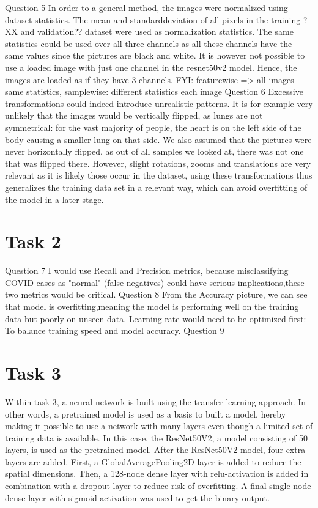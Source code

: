 \documentclass[conference]{IEEEtran}
\begin{document}
Question 5
In order to a general method, the images were normalized using dataset statistics. The mean and standarddeviation of all pixels in the training ?XX and validation?? dataset were used as normalization statistics. 
The same statistics could be used over all three channels as all these channels have the same values since the pictures are black and white. It is however not possible to use a loaded image with just one channel in the resnet50v2 model. Hence, the images are loaded as if they have 3 channels.
FYI: featurewise => all images same statistics, samplewise: different statistics each image
Question 6
Excessive transformations could indeed introduce unrealistic patterns. It is for example very unlikely that the images would be vertically flipped, as lungs are not symmetrical: for the vast majority of people, the heart is on the left side of the body causing a smaller lung on that side. 
We also assumed that the pictures were never horizontally flipped, as out of all samples we looked at, there was not one that was flipped there. However, slight rotations, zooms and translations are very relevant as it is likely those occur in the dataset, using these transformations thus generalizes the training data set in a relevant way, which can avoid overfitting of the model in a later stage.

\section{Task 2}
Question 7
I would use Recall and Precision metrics, because misclassifying COVID cases as "normal" (false negatives) could have serious implications,these two metrics would be critical.
Question 8
From the Accuracy picture, we can see that model is overfitting,meaning the model is performing well on the training data but poorly on unseen data. Learning rate would need to be optimized first: To balance training speed and model accuracy.
Question 9


\section{Task 3}

Within task 3, a neural network is built using the transfer learning approach. In other words, a pretrained model is used as a basis to built a model, hereby making it possible to use a network with many layers even though a limited set of training data is available. 
In this case, the ResNet50V2, a model consisting of 50 layers, is used as the pretrained model. After the ResNet50V2 model, four extra layers are added. First, a GlobalAveragePooling2D layer is added to reduce the spatial dimensions. Then, a 128-node dense layer with relu-activation is added in combination with a dropout layer to reduce risk of overfitting. A final single-node dense layer with sigmoid activation was used to get the binary output.
\end{document}

